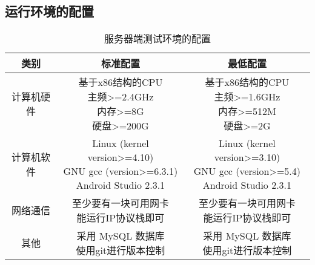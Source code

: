 \subsection{运行环境的配置}
\begin{table}[htbp]
	\centering
	\caption{服务器端测试环境的配置} \label{tab:test-environment}
	\begin{tabular}{|c|c|c|}
		\hline
		类别 & 标准配置 & 最低配置 \\
		\hline
		计算机硬件 & \tabincell{c}{基于x86结构的CPU\\ 主频>=2.4GHz\\ 内存>=8G\\ 硬盘>=200G } & \tabincell{c}{基于x86结构的CPU\\ 主频>=1.6GHz\\ 内存>=512M\\ 硬盘>=2G} \\
		\hline
		计算机软件 & \tabincell{c}{Linux (kernel version>=4.10)\\ GNU gcc (version>=6.3.1)\\Android Studio 2.3.1 } & \tabincell{c}{Linux (kernel version>=3.10)\\ GNU gcc (version>=5.4)\\Android Studio 2.3.1} \\
		\hline
		网络通信 & \tabincell{c}{至少要有一块可用网卡\\ 能运行IP协议栈即可} & \tabincell{c}{至少要有一块可用网卡\\ 能运行IP协议栈即可} \\
		\hline
		其他 & \tabincell{c}{采用 MySQL 数据库\\ 使用git进行版本控制} & \tabincell{c}{采用 MySQL 数据库\\ 使用git进行版本控制} \\
		\hline
	\end{tabular}
\end{table}

